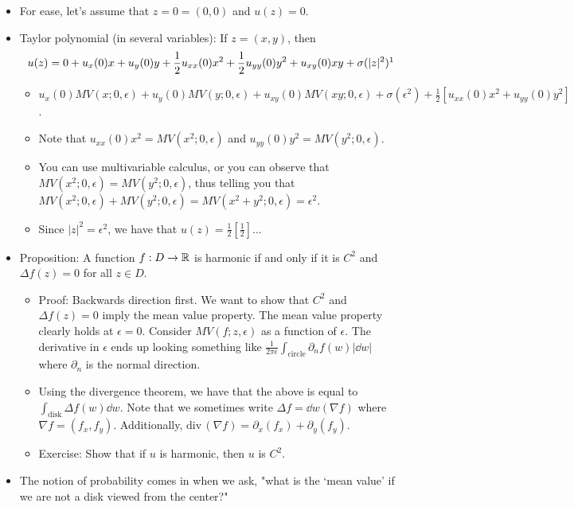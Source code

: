 \documentclass[../apprentice.tex]{subfiles}
\begin{document}
\begin{itemize}
    \item For ease, let's assume that $z=0=(0,0)$ and $u(z)=0$.
    \item Taylor polynomial (in several variables): If $z=(x,y)$, then
    \begin{equation*}
        u(z) = 0+u_x(0)x+u_y(0)y+\frac{1}{2}u_{xx}(0)x^2+\frac{1}{2}u_{yy}(0)y^2+u_{xy}(0)xy+\sigma(|z|^2)\footnotemark
    \end{equation*}
    \begin{itemize}
        \item $u_x(0)MV(x;0,\epsilon)+u_y(0)MV(y;0,\epsilon)+u_{xy}(0)MV(xy;0,\epsilon)+\sigma(\epsilon^2)+\frac{1}{2}[u_{xx}(0)x^2+u_{yy}(0)y^2]$.
        \item Note that $u_{xx}(0)x^2=MV(x^2;0,\epsilon)$ and $u_{yy}(0)y^2=MV(y^2;0,\epsilon)$.
        \item You can use multivariable calculus, or you can observe that $MV(x^2;0,\epsilon)=MV(y^2;0,\epsilon)$, thus telling you that $MV(x^2;0,\epsilon)+MV(y^2;0,\epsilon)=MV(x^2+y^2;0,\epsilon)=\epsilon^2$.
        \item Since $|z|^2=\epsilon^2$, we have that $u(z)=\frac{1}{2}[\frac{1}{2}]$...
    \end{itemize}
    \item Proposition: A function $f:D\to\mathbb{R}$ is harmonic if and only if it is $C^2$ and $\Delta f(z)=0$ for all $z\in D$.
    \begin{itemize}
        \item Proof: Backwards direction first. We want to show that $C^2$ and $\Delta f(z)=0$ imply the mean value property. The mean value property clearly holds at $\epsilon=0$. Consider $MV(f;z,\epsilon)$ as a function of $\epsilon$. The derivative in $\epsilon$ ends up looking something like $\frac{1}{2\pi\epsilon}\int_\text{circle}\partial_nf(w)|\dd{w}|$ where $\partial_n$ is the normal direction.
        \item Using the divergence theorem, we have that the above is equal to $\int_\text{disk}\Delta f(w)\dd{w}$. Note that we sometimes write $\Delta f=\dd{w}(\nabla f)$ where $\nabla f=(f_x,f_y)$. Additionally, $\text{div}\,(\nabla f)=\partial_x(f_x)+\partial_y(f_y)$.
        \item Exercise: Show that if $u$ is harmonic, then $u$ is $C^2$.
    \end{itemize}
    \item The notion of probability comes in when we ask, "what is the `mean value' if we are not a disk viewed from the center?"
\end{itemize}
\end{document}
